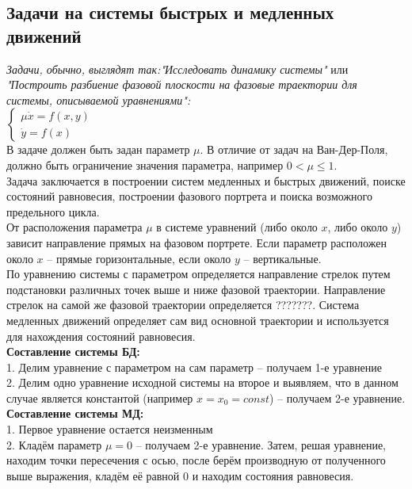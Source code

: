 \begin{multicols*}{2}
		\section{Задачи на системы быстрых и медленных движений}
		\textit{Задачи, обычно, выглядят так:"Исследовать динамику системы"} или \textit{"Построить разбиение фазовой плоскости на фазовые траектории для системы, описываемой уравнениями":\\
		$\begin{cases}
			\mu\dot{x} = f(x, y)\\
			\dot{y} = f(x)
		\end{cases}$}\\
		В задаче должен быть задан параметр $\mu$. В отличие от задач на Ван-Дер-Поля, должно быть ограничение значения параметра, например $0 < \mu \leqslant 1$.\\
		Задача заключается в построении систем медленных и быстрых движений, поиске состояний равновесия, построении фазового портрета и поиска возможного предельного цикла.  \\
		От расположения параметра $\mu$ в системе уравнений (либо около $x$, либо около $y$) зависит направление прямых на фазовом портрете. Если параметр расположен около $x$ – прямые горизонтальные, если около $y$ – вертикальные.\\ 
		По уравнению системы с параметром определяется направление стрелок путем подстановки различных точек выше и ниже фазовой траектории. Направление стрелок на самой же фазовой траектории определяется ???????. Система медленных движений определяет сам вид основной траектории и используется для нахождения состояний равновесия.\\ 
		\textbf{Составление системы БД:}\\
		1. Делим уравнение с параметром на сам параметр – получаем 1-е уравнение\\
		2. Делим одно уравнение исходной системы на второе и выявляем, что в данном случае является константой (например $x = x_0 = const$) – получаем 2-е уравнение.\\
		\textbf{Составление системы МД:}\\
		1. Первое уравнение остается неизменным\\
		2. Кладём параметр $\mu = 0$ – получаем 2-е уравнение. Затем, решая уравнение, находим точки пересечения с осью, после берём производную от полученного выше выражения, кладём её равной 0 и находим состояния равновесия.


	\end{multicols*}
